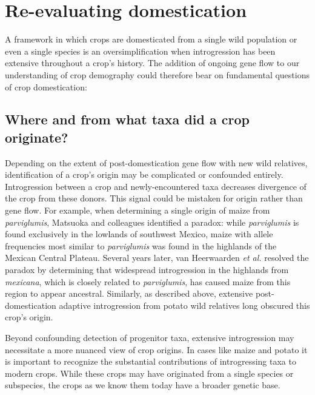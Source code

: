 \documentclass[11pt]{article}
\begin{document}
\section*{Re-evaluating domestication}

A framework in which crops are domesticated from a single wild population or even a single species is an oversimplification when introgression has been extensive throughout a crop's history.
The addition of ongoing gene flow to our understanding of crop demography could therefore bear on fundamental questions of crop domestication:

\subsection*{Where and from what taxa did a crop originate?}
Depending on the extent of post-domestication gene flow with new wild relatives, identification of a crop's origin may be complicated or confounded entirely.
Introgression between a crop and newly-encountered taxa decreases divergence of the crop from these donors.
This signal could be mistaken for origin rather than gene flow.
For example, when determining a single origin of maize from \emph{parviglumis}, Matsuoka and colleagues \cite{matsuoka2002single} identified a paradox: while \emph{parviglumis} is found exclusively in the lowlands of southwest Mexico, maize with allele frequencies most similar to \emph{parviglumis} was found in the highlands of the Mexican Central Plateau.
Several years later, van Heerwaarden \emph{et al.} \cite{vanHeerwaarden2011} resolved the paradox by determining that widespread introgression in the highlands from \emph{mexicana}, which is closely related to \emph{parviglumis}, has caused maize from this region to appear ancestral.
Similarly, as described above, extensive post-domestication adaptive introgression from  potato wild relatives long obscured this crop's origin.

Beyond confounding detection of progenitor taxa, extensive introgression may necessitate a more nuanced view of crop origins.
In cases like maize and potato it is important to recognize the substantial contributions of introgressing taxa to modern crops.
While these crops may have originated from a single species or subspecies, the crops as we know them today have a broader genetic base.
\end{document}
